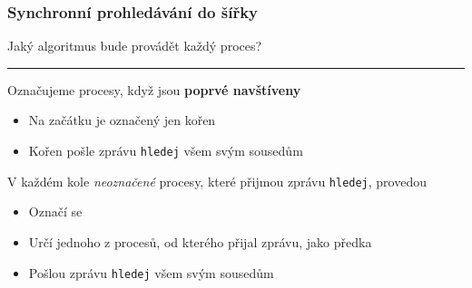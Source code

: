 \documentclass[usenames,dvipsnames,9pt]{beamer}
\begin{document}
\begin{frame}
\begin{center}
%
\end{center}
\end{frame}

\begin{frame}
\frametitle{Synchronní prohledávání do šířky}

\begin{center}
Jaký algoritmus bude provádět každý proces?
\end{center}

  \pause\vspace{1em}\hrule\vspace{1em}

Označujeme procesy, když jsou {\bf poprvé navštíveny}
\begin{itemize}
\item Na začátku je označený jen kořen
\item Kořen pošle zprávu \texttt{hledej} všem svým sousedům
\end{itemize}
\pause
V každém kole \textit{neoznačené} procesy, které přijmou zprávu \texttt{hledej}, provedou
\begin{itemize}
\item Označí se
\item Určí jednoho z procesů, od kterého přijal zprávu, jako předka
\item Pošlou zprávu \texttt{hledej} všem svým sousedům
\end{itemize}



\end{frame}
\end{document}
